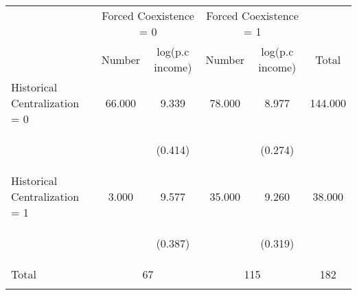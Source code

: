 \begin{center}
\begin{tabular}{lccccc}
\hline \noalign{\smallskip} & \multicolumn{2}{c}{Forced Coexistence = 0} & \multicolumn{2}{c}{Forced Coexistence = 1} & \\
 & Number & log(p.c income) & Number & log(p.c income) & Total\\
\noalign{\smallskip}\hline \noalign{\smallskip}Historical Centralization = 0 & 66.000 & 9.339 & 78.000 & 8.977 & 144.000\\
 & \begin{footnotesize}\end{footnotesize} & \begin{footnotesize}(0.414)\end{footnotesize} & \begin{footnotesize}\end{footnotesize} & \begin{footnotesize}(0.274)\end{footnotesize} & \begin{footnotesize}\end{footnotesize}\\
\noalign{\smallskip}Historical Centralization = 1 & 3.000 & 9.577 & 35.000 & 9.260 & 38.000\\
 & \begin{footnotesize}\end{footnotesize} & \begin{footnotesize}(0.387)\end{footnotesize} & \begin{footnotesize}\end{footnotesize} & \begin{footnotesize}(0.319)\end{footnotesize} & \begin{footnotesize}\end{footnotesize}\\
\noalign{\smallskip}Total & \multicolumn{2}{c}{67} & \multicolumn{2}{c}{115} & 182\\
\noalign{\smallskip}\hline\end{tabular}\\
\end{center}
